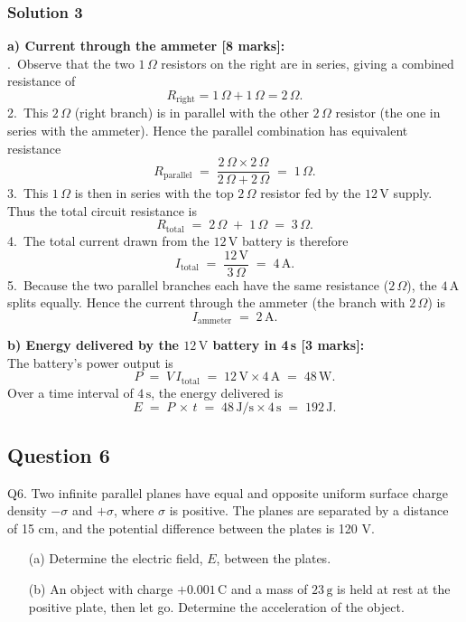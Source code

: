 \documentclass{article}
\begin{document}
\subsubsection{Solution 3}
\textbf{a) Current through the ammeter [8 marks]:}\\
.\, Observe that the two \(1\,\Omega\) resistors on the right are in series, giving a combined resistance of 
\[
R_{\text{right}} = 1\,\Omega + 1\,\Omega = 2\,\Omega.
\]
2.\, This \(2\,\Omega\) (right branch) is in parallel with the other \(2\,\Omega\) resistor (the one in series with the ammeter). Hence the parallel combination has equivalent resistance
\[
R_{\text{parallel}} \;=\; \frac{2 \,\Omega \times 2\,\Omega}{2\,\Omega + 2\,\Omega}
\;=\; 1\,\Omega.
\]
3.\, This \(1\,\Omega\) is then in series with the top \(2\,\Omega\) resistor fed by the \(12\,\mathrm{V}\) supply. Thus the total circuit resistance is
\[
R_{\text{total}} \;=\; 2\,\Omega \;+\; 1\,\Omega \;=\; 3\,\Omega.
\]
4.\, The total current drawn from the \(12\,\mathrm{V}\) battery is therefore
\[
I_{\text{total}} \;=\; \frac{12\,\mathrm{V}}{3\,\Omega} 
\;=\; 4\,\mathrm{A}.
\]
5.\, Because the two parallel branches each have the same resistance (\(2\,\Omega\)), the \(4\,\mathrm{A}\) splits equally. Hence the current through the ammeter (the branch with \(2\,\Omega\)) is
\[
I_{\text{ammeter}} \;=\; 2\,\mathrm{A}.
\]

\textbf{b) Energy delivered by the \(12\,\mathrm{V}\) battery in 4\,s [3 marks]:}\\
\noindent
The battery’s power output is
\[
P \;=\; V \, I_{\text{total}} \;=\; 12\,\mathrm{V} \times 4\,\mathrm{A}
\;=\; 48\,\mathrm{W}.
\]
Over a time interval of \(4\,\mathrm{s}\), the energy delivered is
\[
E \;=\; P\,\times\, t
\;=\; 48\,\mathrm{J/s} \times 4\,\mathrm{s}
\;=\; 192\,\mathrm{J}.
\]


\subsection{Question 6}
Q6. Two infinite parallel planes have equal and opposite uniform surface charge density $-\sigma$ and $+\sigma$, where $\sigma$ is positive. The planes are separated by a distance of 15 cm, and the potential difference between the plates is 120 V.

\begin{enumerate}
    \item[(a)] Determine the electric field, $E$, between the plates.
    \item[(b)] An object with charge $+0.001 \, \text{C}$ and a mass of $23 \, \text{g}$ is held at rest at the positive plate, then let go. Determine the acceleration of the object.
\end{enumerate}
\end{document}
